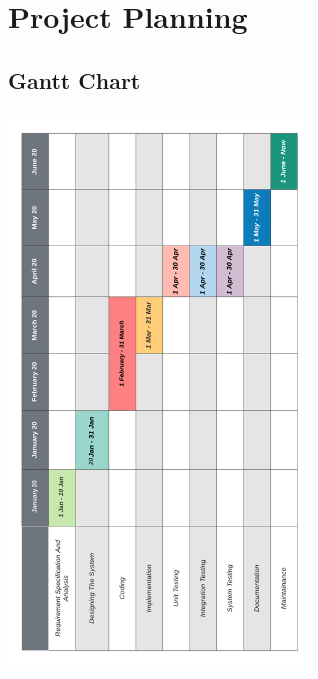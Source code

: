 \section{Project Planning}
		\subsection{Gantt Chart}
		\begin{center}
			\includegraphics[width=8cm]{gc.png}
		\end{center}
